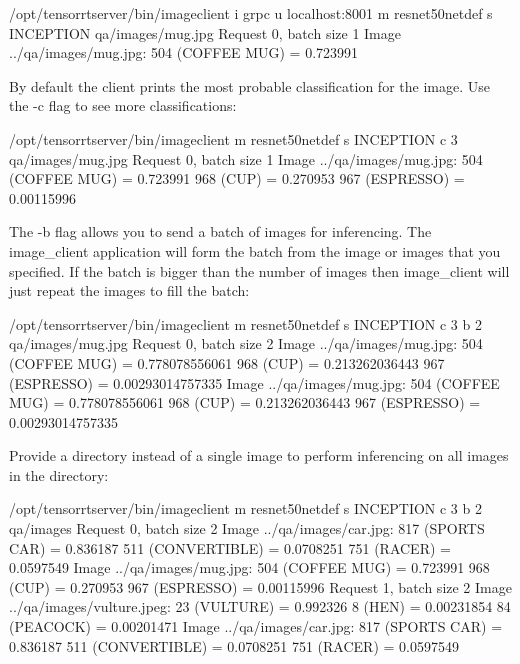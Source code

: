 \documentclass[letterpaper,10pt,english]{sphinxmanual}
\begin{document}
\begin{sphinxVerbatim}[commandchars=\\\{\}]
\PYGZdl{} /opt/tensorrtserver/bin/image\PYGZus{}client \PYGZhy{}i grpc \PYGZhy{}u localhost:8001 \PYGZhy{}m resnet50\PYGZus{}netdef \PYGZhy{}s INCEPTION qa/images/mug.jpg
Request 0, batch size 1
Image \PYGZsq{}../qa/images/mug.jpg\PYGZsq{}:
    504 (COFFEE MUG) = 0.723991
\end{sphinxVerbatim}

By default the client prints the most probable classification for the
image. Use the -c flag to see more classifications:

\begin{sphinxVerbatim}[commandchars=\\\{\}]
\PYGZdl{} /opt/tensorrtserver/bin/image\PYGZus{}client \PYGZhy{}m resnet50\PYGZus{}netdef \PYGZhy{}s INCEPTION \PYGZhy{}c 3 qa/images/mug.jpg
Request 0, batch size 1
Image \PYGZsq{}../qa/images/mug.jpg\PYGZsq{}:
    504 (COFFEE MUG) = 0.723991
    968 (CUP) = 0.270953
    967 (ESPRESSO) = 0.00115996
\end{sphinxVerbatim}

The -b flag allows you to send a batch of images for inferencing.
The image\_client application will form the batch from the image or
images that you specified. If the batch is bigger than the number of
images then image\_client will just repeat the images to fill the
batch:

\begin{sphinxVerbatim}[commandchars=\\\{\}]
\PYGZdl{} /opt/tensorrtserver/bin/image\PYGZus{}client \PYGZhy{}m resnet50\PYGZus{}netdef \PYGZhy{}s INCEPTION \PYGZhy{}c 3 \PYGZhy{}b 2 qa/images/mug.jpg
Request 0, batch size 2
Image \PYGZsq{}../qa/images/mug.jpg\PYGZsq{}:
    504 (COFFEE MUG) = 0.778078556061
    968 (CUP) = 0.213262036443
    967 (ESPRESSO) = 0.00293014757335
Image \PYGZsq{}../qa/images/mug.jpg\PYGZsq{}:
    504 (COFFEE MUG) = 0.778078556061
    968 (CUP) = 0.213262036443
    967 (ESPRESSO) = 0.00293014757335
\end{sphinxVerbatim}

Provide a directory instead of a single image to perform inferencing
on all images in the directory:

\begin{sphinxVerbatim}[commandchars=\\\{\}]
\PYGZdl{} /opt/tensorrtserver/bin/image\PYGZus{}client \PYGZhy{}m resnet50\PYGZus{}netdef \PYGZhy{}s INCEPTION \PYGZhy{}c 3 \PYGZhy{}b 2 qa/images
Request 0, batch size 2
Image \PYGZsq{}../qa/images/car.jpg\PYGZsq{}:
    817 (SPORTS CAR) = 0.836187
    511 (CONVERTIBLE) = 0.0708251
    751 (RACER) = 0.0597549
Image \PYGZsq{}../qa/images/mug.jpg\PYGZsq{}:
    504 (COFFEE MUG) = 0.723991
    968 (CUP) = 0.270953
    967 (ESPRESSO) = 0.00115996
Request 1, batch size 2
Image \PYGZsq{}../qa/images/vulture.jpeg\PYGZsq{}:
    23 (VULTURE) = 0.992326
    8 (HEN) = 0.00231854
    84 (PEACOCK) = 0.00201471
Image \PYGZsq{}../qa/images/car.jpg\PYGZsq{}:
    817 (SPORTS CAR) = 0.836187
    511 (CONVERTIBLE) = 0.0708251
    751 (RACER) = 0.0597549
\end{sphinxVerbatim}
\end{document}

